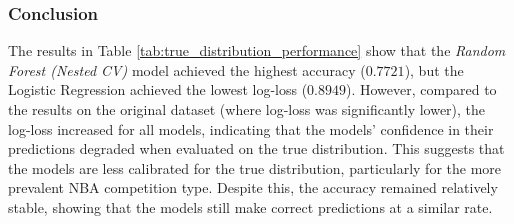 \documentclass[fleqn,moreauthors,10pt]{ds_report}
\begin{document}
\subsubsection*{Conclusion}
The results in Table \ref{tab:true_distribution_performance} show that the \textit{Random Forest (Nested CV)} model achieved the highest accuracy (\( 0.7721 \)), but the Logistic Regression achieved the lowest log-loss (\( 0.8949 \)). However, compared to the results on the original dataset (where log-loss was significantly lower), the log-loss increased for all models, indicating that the models' confidence in their predictions degraded when evaluated on the true distribution. This suggests that the models are less calibrated for the true distribution, particularly for the more prevalent NBA competition type. Despite this, the accuracy remained relatively stable, showing that the models still make correct predictions at a similar rate.










\end{document}
